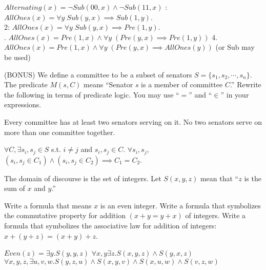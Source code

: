\documentclass[solution, letterpaper]{cs20inclass}
\begin{document}
\begin{solution}
\subsolution $Alternating(x) = \neg Sub(00, x) \wedge \neg Sub(11, x)$
: $AllOnes(x) = \forall y \; Sub(y, x) \implies Sub(1, y)$.\\
2: $AllOnes(x) = \forall y \; Sub(y, x) \implies Pre(1, y)$.\\
. $AllOnes(x) = Pre(1, x) \wedge \forall y \; ( Pre(y, x) \implies Pre(1, y))$
4. $AllOnes(x) = Pre(1, x) \wedge \forall y \; (Pre(y, x) \implies AllOnes(y))$ (or Sub may be used)

\end{solution}


\problem
(BONUS) We define a committee to be a subset of senators $S = \{s_1,s_2,\cdots,s_n\}$. The predicate $M(s,C)$ means ``Senator $s$ is a member of committee $C$.'' Rewrite the following in terms of predicate logic. You may use ``$=$'' and ``$\in$'' in your expressions.

\subproblem Every committee has at least two senators serving on it.
\subproblem No two senators serve on more than one committee together.

\begin{solution}
\subsolution $\forall C, \exists s_i, s_j  \in S $ s.t. $i \neq j$ and $s_i, s_j \in C$.
\subsolution $\forall s_i, s_j$, $(s_i, s_j \in C_1) \wedge (s_i, s_j \in C_2) \implies C_1 = C_2$.
\end{solution}

\problem The domain of discourse is the set of integers. Let $S(x, y, z)$ mean that ``$z$ is the sum of $x$ and $y$.''

\subproblem Write a formula that means $x$ is an even integer. 
\subproblem Write a formula that symbolizes the commutative property for addition $(x+y = y+x)$ of integers.
\subproblem Write a formula that symbolizes the associative law for addition of integers:\\ $x + (y + z) = (x + y) + z$.

\begin{solution}
\subsolution $Even(z) = \exists y. S(y, y, z)$   
\subsolution $\forall x, y \exists z . S(x, y, z) \wedge S(y, x, z)$
\subsolution $\forall x, y, z, \exists u, v, w . S(y, z, u) \wedge S(x, y, v) \wedge S(x, u, w) \wedge S(v, z, w)$
\end{solution}
\end{document}
